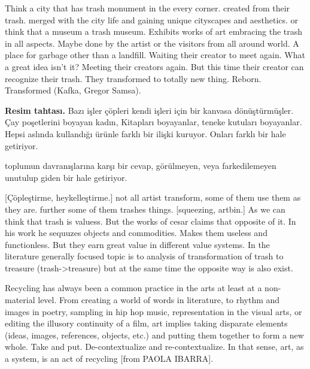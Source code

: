Think a city that has trash monument in the every corner. created from their trash. merged with the city life and gaining unique cityscapes and aesthetics. or think that a museum a trash museum. Exhibits works of art embracing the trash in all aspects. Maybe done by the artist or the visitors from all around world. A place for garbage other than a landfill. Waiting their creator to meet again. What a great idea isn't it? Meeting their creators again. But this time their creator can recognize their trash. They transformed to totally new thing. Reborn. Transformed (Kafka, Gregor Samsa).



\textbf{Resim tahtası.} Bazı işler çöpleri kendi işleri için bir kanvasa dönüştürmüşler. Çay poşetlerini boyayan kadın, Kitapları boyayanlar, teneke kutuları boyayanlar. Hepsi aslında kullandığı ürünle farklı bir ilişki kuruyor. Onları farklı bir hale getiriyor.  

toplumun davranışlarına karşı bir cevap, görülmeyen, veya farkedilemeyen unutulup giden bir hale getiriyor.

[Çöpleştirme, heykelleştirme.] not all artist transform, some of them use them as they are. further some of them trashes things. [squeezing, artbin.] As we can think that trash is valuess. But the works of cesar claims that opposite of it. In his work he sequuzes objects and commodities. Makes them useless and functionless. But they earn great value in different value systems. In the literature generally focused topic is to analysis of transformation of trash to treasure (trash->treasure) but at the same time the opposite way is also exist.

Recycling has always been a common practice in the arts at least at a non-material level. From creating a world of words in literature, to rhythm and images in poetry, sampling in hip hop music, representation in the visual arts, or editing the illusory continuity of a film, art implies taking disparate elements (ideas, images, references, objects, etc.) and putting them together to form a new whole. Take and put. De-contextualize and re-contextualize. In that sense, art, as a system, is an act of recycling [from PAOLA IBARRA]. 





